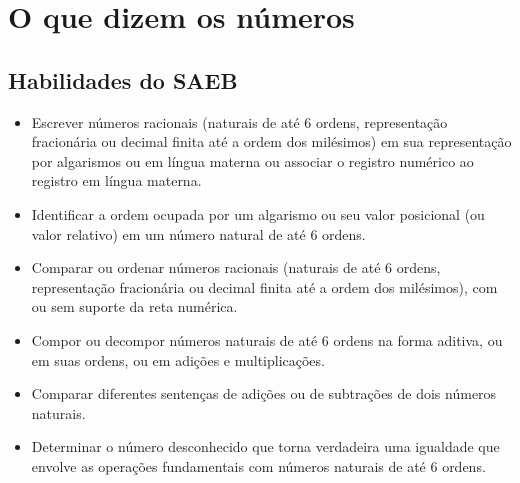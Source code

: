 





\chapter{O que dizem os números}

\vspace*{-1cm}

\section*{Habilidades do SAEB}


\begin{itemize}
  \item Escrever números racionais (naturais de até 6 ordens, representação
fracionária ou decimal finita até a ordem dos milésimos) em sua
representação por algarismos ou em língua materna ou associar o registro
numérico ao registro em língua materna.

  \item Identificar a ordem ocupada por um algarismo ou seu valor posicional
(ou valor relativo) em um número natural de até 6 ordens.

  \item Comparar ou ordenar números racionais (naturais de até 6 ordens,
representação fracionária ou decimal finita até a ordem dos milésimos),
com ou sem suporte da reta numérica.

  \item Compor ou decompor números naturais de até 6 ordens na forma aditiva,
ou em suas ordens, ou em adições e multiplicações.

  \item Comparar diferentes sentenças de adições ou de subtrações de dois
números naturais.

  \item Determinar o número desconhecido que torna verdadeira uma igualdade
que envolve as operações fundamentais com números naturais de até 6
ordens.
\end{itemize}


